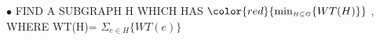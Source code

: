 \documentclass[preview]{standalone}
\begin{document}
\begin{center}
$\bullet$ FIND   A   SUBGRAPH   H  WHICH   HAS $\color{red}{ \min_{\scriptscriptstyle H \subseteq G} \{ WT(H) \}}$ ,  WHERE   WT(H)= $\Sigma_{e \in H} \{ WT(e) \}$
\end{center}
\end{document}
